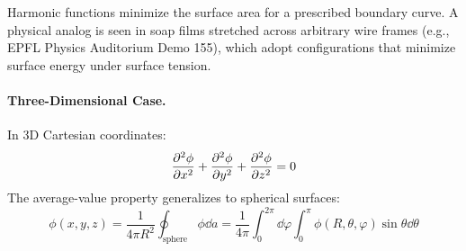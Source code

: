 \begin{remark}
Harmonic functions minimize the surface area for a prescribed boundary curve. A physical analog is seen in soap films stretched across arbitrary wire frames (e.g., EPFL Physics Auditorium Demo 155), which adopt configurations that minimize surface energy under surface tension.
\end{remark}

\paragraph{Three-Dimensional Case.}
In 3D Cartesian coordinates:
\begin{equation}
    \pdv[2]{\phi}{x} + \pdv[2]{\phi}{y} + \pdv[2]{\phi}{z} = 0
\end{equation}
The average-value property generalizes to spherical surfaces:
\begin{equation}
    \phi(x, y, z) = \frac{1}{4\pi R^2} \oint_{\text{sphere}} \phi \dd{a} = \frac{1}{4\pi} \int_0^{2\pi} \dd{\varphi} \int_0^\pi \phi(R, \theta, \varphi) \sin\theta \dd{\theta}
\end{equation}

